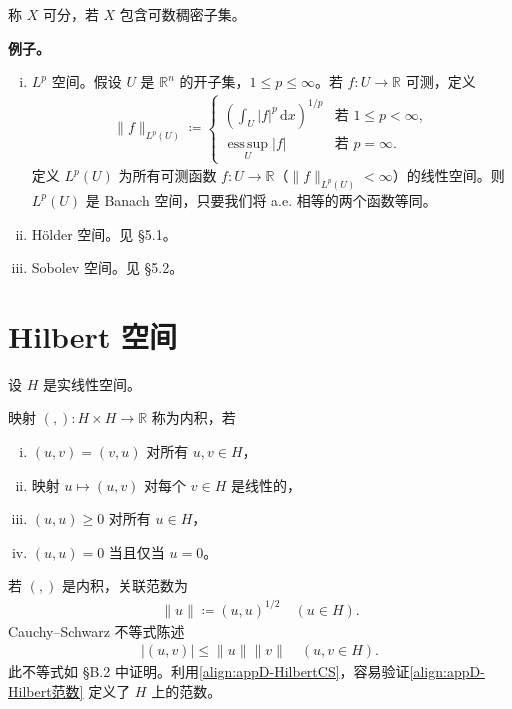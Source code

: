 \documentclass[../main.tex]{subfiles}
\begin{document}
\begin{definition}\label{definition:appD-可分}
称 $X$ 可分，若 $X$ 包含可数稠密子集。
\end{definition}

\begin{remark}\label{remark:appD-例子}
\textbf{例子。}
\begin{enumerate}[(i)]
\item $L^p$ 空间。假设 $U$ 是 $\mathbb{R}^n$ 的开子集，$1\leqslant p\leqslant\infty$。若 $f:U\to\mathbb{R}$ 可测，定义
\begin{align*}
\|f\|_{L^p(U)}\coloneqq
\begin{cases}
\left(\int_U|f|^p\,\mathrm{d}x\right)^{1/p} & \text{若 } 1\leqslant p<\infty,\\
\operatorname*{ess\,sup}_U|f| & \text{若 } p=\infty.
\end{cases}
\end{align*}
定义 $L^p(U)$ 为所有可测函数 $f:U\to\mathbb{R}$（$\|f\|_{L^p(U)}<\infty$）的线性空间。则 $L^p(U)$ 是 Banach 空间，只要我们将 a.e. 相等的两个函数等同。

\item H\"older 空间。见 \S5.1。

\item Sobolev 空间。见 \S5.2。
\end{enumerate}
\end{remark}

\section{Hilbert 空间}\label{section:appD-Hilbert空间}

设 $H$ 是实线性空间。

\begin{definition}\label{definition:appD-内积}
映射 $(,):H\times H\to\mathbb{R}$ 称为内积，若
\begin{enumerate}[(i)]
\item $(u,v)=(v,u)$ 对所有 $u,v\in H$，
\item 映射 $u\mapsto(u,v)$ 对每个 $v\in H$ 是线性的，
\item $(u,u)\geqslant 0$ 对所有 $u\in H$，
\item $(u,u)=0$ 当且仅当 $u=0$。
\end{enumerate}
\end{definition}

\begin{definition}\label{definition:appD-Hilbert范数}
若 $(,)$ 是内积，关联范数为
\begin{align}
\|u\|\coloneqq(u,u)^{1/2} \quad (u\in H).
\label{align:appD-Hilbert范数}
\end{align}
Cauchy--Schwarz 不等式陈述
\begin{align}
|(u,v)|\leqslant\|u\|\|v\| \quad (u,v\in H).
\label{align:appD-HilbertCS}
\end{align}
此不等式如 \S B.2 中证明。利用\eqref{align:appD-HilbertCS}，容易验证\eqref{align:appD-Hilbert范数} 定义了 $H$ 上的范数。
\end{definition}
\end{document}
